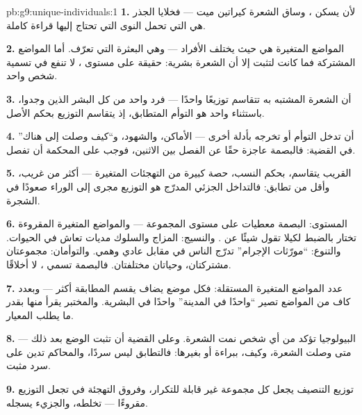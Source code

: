 \begin{solution}{pb:g9:unique-individuals:1}
\textbf{1.} لأن  يسكن ، وساق الشعرة كيراتين
ميت --- فخلايا الجذر هي التي تحمل النوى التي تحتاج إليها
قراءة كاملة.

\textbf{2.} المواضع المتغيرة هي حيث يختلف الأفراد ---
وهي البعثرة التي تعرّف. أما المواضع المشتركة فما كانت
لتثبت إلا أن الشعرة بشرية: حقيقة على مستوى ، لا
تنفع في تسمية شخص واحد.

\textbf{3.} أن  الشعرة  المشتبه به تتقاسم
توزيعًا واحدًا --- فرد واحد من كل البشر الذين وجدوا،
باستثناء واحد هو التوأم المتطابق، إذ يتقاسم التوزيع
بحكم الأصل.

\textbf{4.} أن تدخل التوأم أو تخرجه بأدلة أخرى ---
الأماكن، والشهود، و``كيف وصلت إلى هناك'' في القضية:
فالبصمة عاجزة حقًا عن الفصل بين الاثنين، فوجب على
المحكمة أن تفصل.

\textbf{5.} القريب يتقاسم، بحكم النسب، حصة كبيرة من
التهجئات المتغيرة --- أكثر من غريب، وأقل من تطابق:
فالتداخل الجزئي المدرّج  هو التوزيع مجرى إلى
الوراء صعودًا في الشجرة.

\textbf{6.} المستوى: البصمة معطيات على مستوى المجموعة
--- والمواضع المتغيرة المقروءة تختار بالضبط لكيلا تقول
شيئًا عن . والنسيج: المزاج والسلوك مديات تعاش في
الحيوات. والتنوع: ``مورّثات الإجرام'' تدرّج الناس في
مقابل عادي وهمي. والتوأمان: مجموعتان مشتركتان، وحياتان
مختلفتان. فالبصمة تسمي ، لا أخلاقًا.

\textbf{7.} عدد المواضع المتغيرة المستقلة: فكل موضع
يضاف يقسم  المطابقة أكثر --- وبعدد كاف من
المواضع تصير ``واحدًا في المدينة'' واحدًا في البشرية.
والمختبر يقرأ منها بقدر ما يطلب المعيار.

\textbf{8.} البيولوجيا تؤكد من أي شخص نمت الشعرة. وعلى
القضية أن تثبت الوضع بعد ذلك --- متى وصلت الشعرة، وكيف،
ببراءة أو بغيرها: فالتطابق ليس سردًا، والمحاكم تدين على
سرد مثبت.

\textbf{9.} توزيع التنصيف  يجعل كل مجموعة غير
قابلة للتكرار، وفروق التهجئة في  تجعل التوزيع
مقروءًا ---  تخلطه، والجزيء يسجله.


\end{solution}
